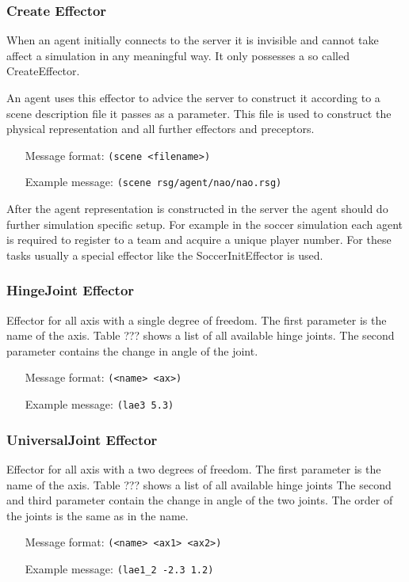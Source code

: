 \subsubsection{Create Effector}
\label{sec:createeffector}

When an agent initially connects to the server it is invisible and
cannot take affect a simulation in any meaningful way. It only
possesses a so called CreateEffector.

An agent uses this effector to advice the server to construct it
according to a scene description file it passes as a parameter. This
file is used to construct the physical representation and all further
effectors and preceptors.
\begin{itemize}
	\item[Message format:] \texttt{(scene  <filename>)}
	\item[Example message:] \texttt{(scene rsg/agent/nao/nao.rsg)}
\end{itemize}

After the agent representation is constructed in the server the agent
should do further simulation specific setup. For example in the soccer
simulation each agent is required to register to a team and acquire a
unique player number. For these tasks usually a special effector like
the SoccerInitEffector is used.

\subsubsection{HingeJoint Effector}
\label{sec:HJE}

Effector for all axis with a single degree of freedom.
The first parameter is the name of the axis. Table ??? shows a list of all
available hinge joints. The second parameter contains the change in angle of
the joint.
\begin{itemize}
	\item[Message format:] \texttt{(<name> <ax>)}
	\item[Example message:] \texttt{(lae3 5.3)}
\end{itemize}

\subsubsection{UniversalJoint Effector}
\label{sec:UJE}

Effector for all axis with a two degrees of freedom.
The first parameter is the name of the axis. Table ??? shows a list of all
available hinge joints
The second and third parameter contain the change in angle of the two joints.
The order of the joints is the same as in the name.
\begin{itemize}
	\item[Message format:] \texttt{(<name> <ax1> <ax2>)}
	\item[Example message:] \texttt{(lae1\_2 -2.3 1.2)}
\end{itemize}

